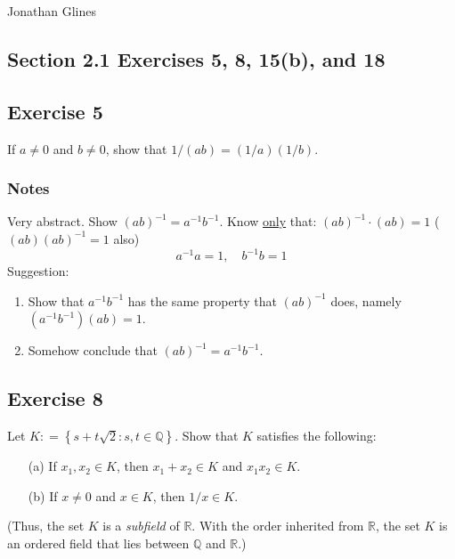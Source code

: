 \documentclass[12pt]{article}
\begin{document}
\begin{flushright}
\Large{Jonathan Glines}
\end{flushright}
\begin{flushleft}
\section*{Section 2.1 Exercises 5, 8, 15(b), and 18}
\subsection*{Exercise 5}
If $a \ne 0$ and $b \ne 0$, show that $1/\left(ab\right) = \left(1/a\right)\left(1/b\right)$.

\subsubsection*{Notes}
Very abstract. Show $\left(ab\right)^{-1} = a^{-1}b^{-1}$. Know \underline{only} that: $\left(ab\right)^{-1}\cdot\left(ab\right) = 1$ ($(ab)(ab)^{-1} = 1$ also)
\[
a^{-1} a = 1,\quad
b^{-1} b = 1
\]
Suggestion:
\begin{enumerate}
\item Show that $a^{-1}b^{-1}$ has the same property that $(ab)^{-1}$ does, namely $(a^{-1}b^{-1})(ab) = 1$.
\item Somehow conclude that $(ab)^{-1} = a^{-1}b^{-1}$.
\end{enumerate}

\subsection*{Exercise 8}
Let $K \mathrel{\mathop:}= \left\{s + t\sqrt{2} : s, t \in \mathbb{Q}\right\}$. Show that $K$ satisfies the following:
\begin{itemize}
\item[(a)] If $x_1, x_2 \in K$, then $x_1 + x_2 \in K$ and $x_1x_2 \in K$.
\item[(b)] If $x \neq 0$ and $x \in K$, then $1/x \in K$.
\end{itemize}
(Thus, the set $K$ is a \textit{subfield} of $\mathbb{R}$. With the order inherited from $\mathbb{R}$, the set $K$ is an ordered field that lies between $\mathbb{Q}$ and $\mathbb{R}$.)


\end{flushleft}
\end{document}

